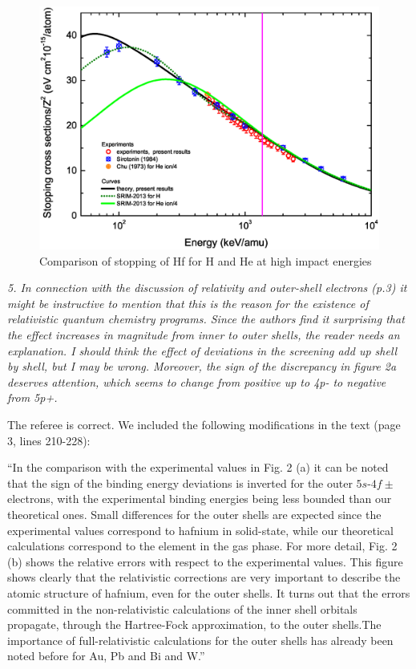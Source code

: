\documentclass[a4paper,10pt]{article}
\begin{document}
\begin{figure}[!t]
\centering
\includegraphics[width=12.cm]{Fig_HeHf.eps}
\caption{Comparison of stopping of Hf for H and He at high impact energies}
\label{HeHf}
\end{figure}

\vspace{0.35cm}
\textsl{5. In connection with the discussion of relativity and outer-shell electrons (p.3) it might be instructive to mention that 
this is the reason for the existence of relativistic quantum chemistry programs. Since the authors find it surprising that the effect increases in magnitude from inner to outer shells, the reader needs an explanation. I should think the effect of deviations in the screening add up shell by shell, but I may be wrong. Moreover, the sign of the discrepancy in figure 2a deserves attention, which seems to change from positive up to 4p- to negative from 5p+.}

\vspace{0.1cm}
{\color{red} The referee is correct. We included the following modifications in the text
(page 3, lines 210-228):}

\vspace{0.1cm}
{\small ``In the comparison with the experimental values in Fig. 2 (a) it can be noted that the sign of the binding energy deviations is inverted for the outer $5s$-$4f\pm$ electrons, with the experimental binding energies being less bounded than our theoretical ones. Small differences for the outer shells are expected since  the experimental
values correspond to hafnium in solid-state, while our theoretical  calculations correspond to the element in the gas phase.
For more detail, Fig. 2 (b) shows  the relative errors
with respect to the experimental  values.
This figure shows clearly that the relativistic corrections are very important to describe
the atomic structure of hafnium, even for the outer shells.
It turns out that the errors committed in the non-relativistic calculations of the inner shell orbitals 
propagate, through the Hartree-Fock approximation, to the outer shells.The importance of full-relativistic calculations for the outer shells has already been noted before for Au, Pb and Bi and W.''}
\end{document}
